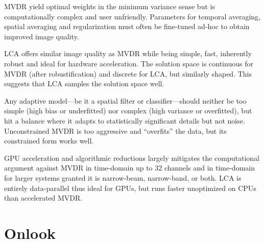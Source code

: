 MVDR yield optimal weights in the minimum variance sense but is computationally complex and user unfriendly. Parameters for temporal averaging, spatial averaging and regularization must often be fine-tuned ad-hoc to obtain improved image quality.

LCA offers similar image quality as MVDR while being simple, fast, inherently robust and ideal for hardware acceleration. The solution space is continuous for MVDR (after robustification) and discrete for LCA, but similarly shaped. This suggests that LCA samples the solution space well.

Any adaptive model---be it a spatial filter or classifier---should neither be too simple (high bias or underfitted) nor complex (high variance or overfitted), but hit a balance where it adapts to statistically significant details but not noise. Unconstrained MVDR is too aggressive and ``overfits'' the data, but its constrained form works well.




%

GPU acceleration and algorithmic reductions largely mitigates the computational argument against MVDR in time-domain up to 32 channels and in time-domain for larger systems granted it is narrow-beam, narrow-band, or both. LCA is entirely data-parallel thus ideal for GPUs, but runs faster unoptimized on CPUs than accelerated MVDR.%

%




\section{Onlook}

